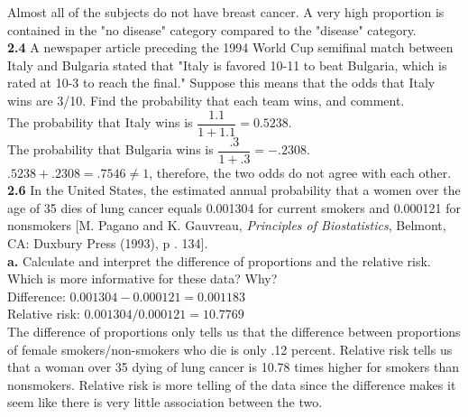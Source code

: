 \documentclass[paper=letter, fontsize=11pt]{scrartcl} %
\begin{document}
Almost all of the subjects do not have breast cancer. A very high proportion is contained in the 
"no disease" category compared to the "disease" category. \\

\textbf{2.4} A newspaper article preceding the 1994 World Cup semifinal match between Italy and 
Bulgaria stated that "Italy is favored 10-11 to beat Bulgaria, which is rated at 10-3 to reach 
the final." Suppose this means that the odds that Italy wins are 3/10. Find the probability that
each team wins, and comment. \\
 
The probability that Italy wins is $\dfrac{1.1}{1 + 1.1} = 0.5238.$ \\
The probability that Bulgaria wins is $\dfrac{.3}{1 + .3} = -.2308.$ \\
$.5238 + .2308 = .7546 \not= 1$, therefore, the two odds do not agree with each other. \\

\textbf{2.6} In the United States, the estimated annual probability that a women over the age
of 35 dies of lung cancer equals 0.001304 for current smokers and 0.000121 for nonsmokers
[M. Pagano and K. Gauvreau, \textit{Principles of Biostatistics}, Belmont, CA: Duxbury Press (1993), p
. 134]. \\

\textbf{a.} Calculate and interpret the difference of proportions and the relative risk.
Which is more informative for these data? Why? \\

Difference: $0.001304 - 0.000121 = 0.001183$ \\
Relative risk: $0.001304 / 0.000121 = 10.7769$ \\
The difference of proportions only tells us that the difference between proportions of female smokers/non-smokers
who die is only .12 percent.
Relative risk tells us that a woman over 35 dying of lung cancer is 10.78 times higher for smokers than nonsmokers.
Relative risk is more telling of the data since the difference makes it seem like there is very little
association between the two. \\
\end{document}
